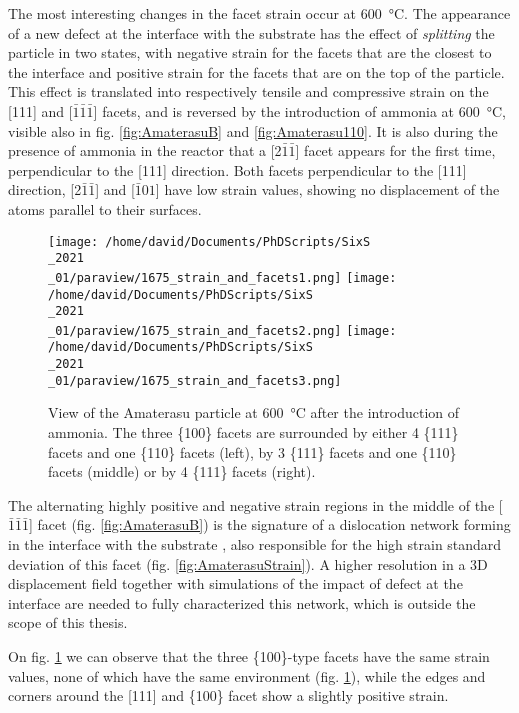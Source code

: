 The most interesting changes in the facet strain occur at \qty{600}{\degreeCelsius}.
The appearance of a new defect at the interface with the substrate has the effect of \textit{splitting} the particle in two states, with negative strain for the facets that are the closest to the interface and positive strain for the facets that are on the top of the particle.
This effect is translated into respectively tensile and compressive strain on the [111] and [$\bar{1}\bar{1}\bar{1}$] facets, and is reversed by the introduction of ammonia at \qty{600}{\degreeCelsius}, visible also in fig. \ref{fig:AmaterasuB} and \ref{fig:Amaterasu110}.
It is also during the presence of ammonia in the reactor that a [2$\bar{1}\bar{1}$] facet appears for the first time, perpendicular to the [111] direction.
Both facets perpendicular to the [111] direction, [2$\bar{1}\bar{1}$] and [$\bar{1}01$] have low strain values, showing no displacement of the atoms parallel to their surfaces.

\begin{figure}[!htb]
    \centering
    \texttt{[image: /home/david/Documents/PhDScripts/SixS\\\_2021\\\_01/paraview/1675\_strain\_and\_facets1.png]}
    \texttt{[image: /home/david/Documents/PhDScripts/SixS\\\_2021\\\_01/paraview/1675\_strain\_and\_facets2.png]}
    \texttt{[image: /home/david/Documents/PhDScripts/SixS\\\_2021\\\_01/paraview/1675\_strain\_and\_facets3.png]}
    \caption{
        View of the Amaterasu particle at \qty{600}{\degreeCelsius} after the introduction of ammonia.
        The three \{100\} facets are surrounded by either 4 \{111\} facets and one \{110\} facets (left), by 3 \{111\} facets and one \{110\} facets (middle) or by 4 \{111\} facets (right).
    }
    \label{fig:AmaterasuStrain1675}
\end{figure}

The alternating highly positive and negative strain regions in the middle of the [$\bar{1}\bar{1}\bar{1}$] facet (fig. \ref{fig:AmaterasuB}) is the signature of a dislocation network forming in the interface with the substrate \parencite{Dupraz2015}, also responsible for the high strain standard deviation of this facet (fig. \ref{fig:AmaterasuStrain}).
A higher resolution in a 3D displacement field together with simulations of the impact of defect at the interface are needed to fully characterized this network, which is outside the scope of this thesis.

On fig. \ref{fig:AmaterasuStrain1675} we can observe that the three \{100\}-type facets have the same strain values, none of which have the same environment (fig. \ref{fig:AmaterasuStrain1675}), while the edges and corners around the [111] and \{100\} facet show a slightly positive strain.

